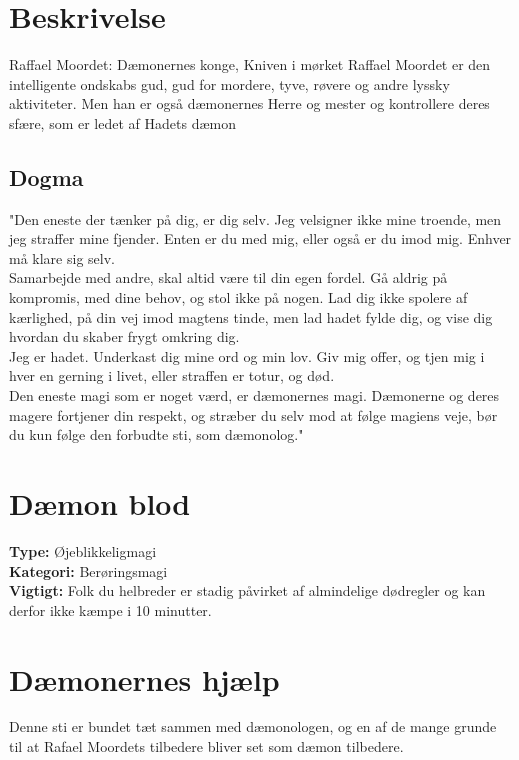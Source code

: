 \section{Beskrivelse}
Raffael Moordet: Dæmonernes konge, Kniven i mørket Raffael Moordet er den intelligente ondskabs
gud, gud for mordere, tyve, røvere og andre lyssky aktiviteter. Men han er også dæmonernes Herre og
mester og kontrollere deres sfære, som er ledet af Hadets dæmon
\subsection{Dogma}
"Den eneste der tænker på dig, er dig selv. Jeg velsigner ikke mine troende, men jeg straffer mine fjender. Enten er du med mig, eller også er du imod mig. Enhver må klare sig selv.\\
Samarbejde med andre, skal altid være til din egen fordel. Gå aldrig på kompromis, med dine behov, og stol ikke på nogen. Lad dig ikke spolere af kærlighed, på din vej imod magtens tinde, men lad hadet fylde dig, og vise dig hvordan du skaber frygt omkring dig.\\
Jeg er hadet. Underkast dig mine ord og min lov. Giv mig offer, og tjen mig i hver en gerning i livet, eller straffen er totur, og død.\\
Den eneste magi som er noget værd, er dæmonernes magi. Dæmonerne og deres magere fortjener din respekt, og stræber du selv mod at følge magiens veje, bør du kun følge den forbudte sti, som dæmonolog."

\section{Dæmon blod}
\textbf{Type:} Øjeblikkeligmagi\\
\textbf{Kategori:} Berøringsmagi\\
\textbf{Vigtigt:} Folk du helbreder er stadig påvirket af almindelige dødregler og kan derfor ikke kæmpe i 10 minutter.\\

\section{Dæmonernes hjælp}
Denne sti er bundet tæt sammen med dæmonologen, og en af de mange grunde til at Rafael Moordets tilbedere bliver set som dæmon tilbedere.\\
